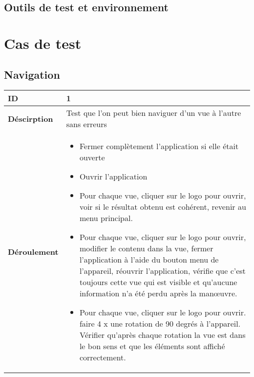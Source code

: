 	\subsection{Outils de test et environnement}
\section{Cas de test \label{tc}}
	\subsection{Navigation}
				 \begin{longtable}{m{4cm}|p{10cm}|}
				 \textbf{ ID} & 1 \\
				 \hline \textbf{Déscirption} & Test que l'on peut bien naviguer d'un vue à l'autre sans erreurs\\
				 \hline \textbf{Déroulement} &
					 \begin{itemize}
						 \item Fermer complètement l'application si elle était ouverte
						 \item Ouvrir l'application
						 \item  Pour chaque vue, cliquer sur le logo pour ouvrir, voir si le résultat obtenu est cohérent, revenir au menu principal.
						 \item  Pour chaque vue, cliquer sur le logo pour ouvrir, modifier le contenu dans la vue, fermer l'application à l'aide du bouton menu de l'appareil, réouvrir l'application, vérifie que c'est toujours cette vue qui est visible et qu'aucune information n'a été perdu après la manœuvre. 
						 \item  Pour chaque vue, cliquer sur le logo pour ouvrir. faire 4 x une rotation de 90 degrés à l'appareil. Vérifier qu'après chaque rotation la vue est dans le bon sens et que les éléments sont affiché correctement. 
					 \end{itemize}
				 \\
			 \end{longtable} 
